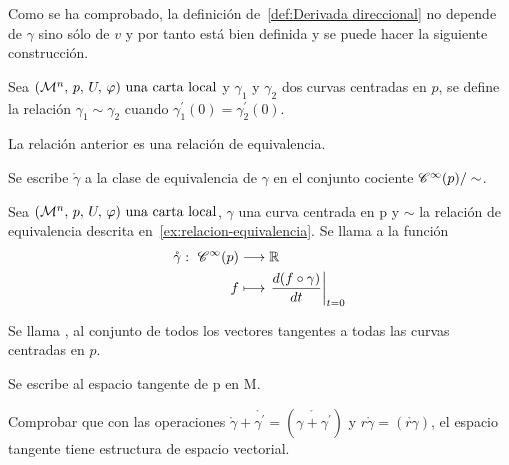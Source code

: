 Como se ha comprobado, la definición de~\ref{def:Derivada direccional} no depende de $\gamma$
sino sólo de $v$ y por tanto está bien definida y se puede hacer la siguiente construcción.

Sea $(\mathcal{M}^n,\thinspace p,\thinspace U,\thinspace \varphi)\textmd{ una carta local}$ y $\gamma_1$ y $\gamma_2$ dos curvas centradas en $p$, se define la relación
$\gamma_1\sim\gamma_2$ cuando $\gamma_1^{'}(0)=\gamma_2^{'}(0)$.

\begin{exercise}
  \label{ex:relacion-equivalencia}
  La relación anterior es una relación de equivalencia.
\end{exercise}
\begin{notation}
Se escribe $\mathring{\gamma}$ a la clase de equivalencia de $\gamma$ en el conjunto cociente
$\mathscr{C}^\infty(p)/\sim$.
\end{notation}

\begin{definition}
  Sea $(\mathcal{M}^n,\thinspace p,\thinspace U,\thinspace \varphi)\textmd{ una carta local}$, $\gamma$ una curva centrada en p y $\sim$ la relación de equivalencia
  descrita en~\ref{ex:relacion-equivalencia}.
  Se llama  a la
  función
  \begin{equation}
    \label{eq:vector-tangente-curva}
    \begin{alignedat}{1}
      \mathring{\gamma}:\ \mathscr{C}^\infty(p) & \longrightarrow \mathbb{R} \\ f & \longmapsto \left.\frac{d(f\circ\gamma)}{dt}\right|_{t=0}
    \end{alignedat}
  \end{equation}
\end{definition}
\begin{definition}
  Se llama , al
  conjunto de todos los vectores tangentes a todas las curvas centradas en $p$.
\end{definition}
\begin{notation}
  Se escribe  al espacio tangente
  de p en M.
\end{notation}

\begin{exercise}
  Comprobar que con las operaciones $\mathring{\gamma}+\mathring{\gamma^\prime}=
  (\mathring{\gamma+\gamma^\prime})$ y $r\mathring{\gamma}=(\mathring{r\gamma})$, el espacio
  tangente tiene estructura de espacio vectorial.
\end{exercise}
